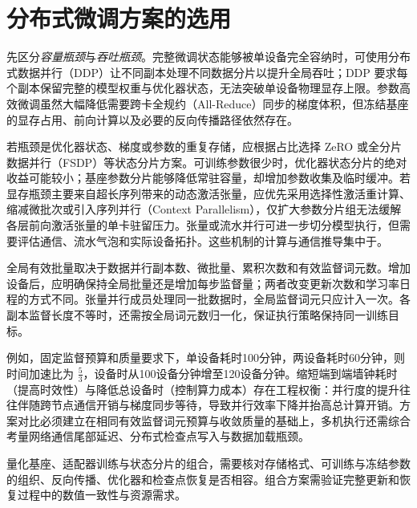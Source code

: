 \documentclass[../textbook.tex]{subfiles}
\begin{document}
\section{分布式微调方案的选用}

先区分\emph{容量瓶颈}与\emph{吞吐瓶颈}。完整微调状态能够被单设备完全容纳时，可使用分布式数据并行（DDP）让不同副本处理不同数据分片以提升全局吞吐；DDP 要求每个副本保留完整的模型权重与优化器状态，无法突破单设备物理显存上限。参数高效微调虽然大幅降低需要跨卡全规约（All-Reduce）同步的梯度体积，但冻结基座的显存占用、前向计算以及必要的反向传播路径依然存在。


若瓶颈是优化器状态、梯度或参数的重复存储，应根据占比选择 ZeRO 或全分片数据并行（FSDP）等状态分片方案。可训练参数很少时，优化器状态分片的绝对收益可能较小；基座参数分片能够降低常驻容量，却增加参数收集及临时缓冲。若显存瓶颈主要来自超长序列带来的动态激活张量，应优先采用选择性激活重计算、缩减微批次或引入序列并行（Context Parallelism），仅扩大参数分片组无法缓解各层前向激活张量的单卡驻留压力。张量或流水并行可进一步切分模型执行，但需要评估通信、流水气泡和实际设备拓扑。这些机制的计算与通信推导集中于。

全局有效批量取决于数据并行副本数、微批量、累积次数和有效监督词元数。增加设备后，应明确保持全局批量还是增加每步监督量；两者改变更新次数和学习率日程的方式不同。张量并行成员处理同一批数据时，全局监督词元只应计入一次。各副本监督长度不等时，还需按全局词元数归一化，保证执行策略保持同一训练目标。

\begin{example}[墙钟时间与设备时成本]
例如，固定监督预算和质量要求下，单设备耗时100分钟，两设备耗时60分钟，则时间加速比为 $\frac{5}{3}$，设备时从100设备分钟增至120设备分钟。缩短端到端墙钟耗时（提高时效性）与降低总设备时（控制算力成本）存在工程权衡：并行度的提升往往伴随跨节点通信开销与梯度同步等待，导致并行效率下降并抬高总计算开销。方案对比必须建立在相同有效监督词元预算与收敛质量的基础上，多机执行还需综合考量网络通信尾部延迟、分布式检查点写入与数据加载瓶颈。
\end{example}

量化基座、适配器训练与状态分片的组合，需要核对存储格式、可训练与冻结参数的组织、反向传播、优化器和检查点恢复是否相容。组合方案需验证完整更新和恢复过程中的数值一致性与资源需求。
\end{document}
